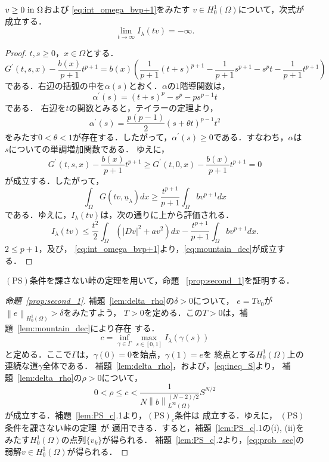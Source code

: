 \begin{lem} \label{lem:mountain_dec}
 $v \geq 0 ~\text{in}~ \Omega$および
 \eqref{eq:int_omega_bvp+1}をみたす
 $v \in H_0^1(\Omega)$について，次式が成立する．
 \begin{equation}
  \lim_{t \to \infty} I_\lambda(tv) =  -\infty. \label{eq:mountain_dec}
 \end{equation}
\end{lem}

\begin{proof}
 $t, s \geq 0$，$x \in \Omega$とする．
 \[
  G^\prime(t, s, x) - \frac{b(x)}{p+1} t^{p+1} = b(x) \left(
 \frac{1}{p+1}(t+s)^{p+1} - \frac{1}{p+1} s^{p+1} - s^p t -
 \frac{1}{p+1} t^{p+1} \right)
 \]
 である．右辺の括弧の中を$\alpha(s)$とおく．$\alpha$の$1$階導関数は，
 \[
  \alpha^\prime(s) = (t+s)^p - s^p - p s^{p-1} t
 \]
 である．
 右辺を$t$の関数とみると，テイラーの定理より，
 \[
  \alpha^\prime(s) = \frac{p(p-1)}{2}(s+ \theta t)^{p-1} t^2
 \]
 をみたす$0 < \theta < 1$が存在する．したがって，$\alpha^\prime(s)
 \geq 0$である．すなわち，$\alpha$は$s$についての単調増加関数である．
 ゆえに，
 \[
 G^\prime(t, s, x) - \frac{b(x)}{p+1} t^{p+1} \geq 
 G^\prime(t, 0, x) - \frac{b(x)}{p+1} t^{p+1} = 0
 \]
 が成立する．したがって，
 \[
  \int_\Omega G(tv, \underline{u}_\lambda) dx \geq
 \frac{t^{p+1}}{p+1} \int_\Omega b v^{p+1} dx
 \]
 である．ゆえに，$I_\lambda(tv)$は，次の通りに上から評価される．
 \[
  I_\lambda(tv) \leq \frac{t^2}{2} \int_\Omega \left( \lvert Dv
 \rvert^2 + av^2 \right) dx - \frac{t^{p+1}}{p+1} \int_\Omega bv^{p+1} dx.
 \]
 $2 \leq p+1$，及び，
 \eqref{eq:int_omega_bvp+1}より，\eqref{eq:mountain_dec}が成立する．\qedhere
\end{proof}

$(\mathrm{PS})$条件を課さない峠の定理を用いて，命題
~\ref{prop:second_1}を証明する．

\begin{proof}[命題~\ref{prop:second_1}]
 補題~\ref{lem:delta_rho}の$\delta > 0$について，
 $e = Tv_0$が$\left\| e \right\|_{H_0^1(\Omega)} > \delta$をみたすよう，
 $T > 0$を定める．この$T > 0$は，補題~\ref{lem:mountain_dec}により存在
 する．
 \[
   c = \inf_{\gamma \in \Gamma} \max_{s \in [0, 1]} I_\lambda ( \gamma
 (s ))
 \]
 と定める．ここで$\Gamma$は，$\gamma(0) = 0$を始点，$\gamma(1) = e$を
 終点とする$H_0^1(\Omega)$上の連続な道$\gamma$全体である．
 補題~\ref{lem:delta_rho}，および，\eqref{eq:ineq_S}より，
 補題~\ref{lem:delta_rho}の$\rho > 0$について，
 \[
  0 < \rho \leq c <    \frac{1}{N\left\| b
             \right\|_{L^\infty(\Omega)} ^{(N-2)/2}} S^{N/2} 
 \]
 が成立する．補題~\ref{lem:PS_c}.1より，$(\mathrm{PS})_c$条件は
 成立する．ゆえに，
 $(\mathrm{PS})$条件を課さない峠の定理~\cite{MR0370183}が
 適用できる．すると，補題~\ref{lem:PS_c}.1の(i), (ii)を
 みたす$H_0^1(\Omega)$の点列$\{ v_k \}$が得られる．
 補題~\ref{lem:PS_c}.2より，\ref{eq:prob_sec}の弱解$v \in
 H_0^1(\Omega)$が得られる．\qedhere
\end{proof}

